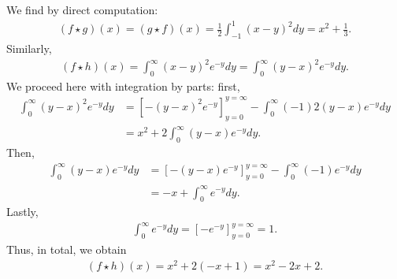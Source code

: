 \documentclass[11pt]{article}
\begin{document}
\begin{solution}
    We find by direct computation:
    \begin{align*}
        (f \star g)(x) = (g \star f)(x) = \frac 1 2 \int_{-1}^1 (x - y)^2 dy = x^2 + \frac 1 3.
    \end{align*}   
    Similarly,
    \begin{align*}
        (f \star h)(x) 
        = 
        \int_{0}^\infty (x - y)^2 e^{-y} dy 
        = 
        \int_{0}^\infty (y - x)^2 e^{-y} dy 
        .
    \end{align*}
    We proceed here with integration by parts: first, 
    \begin{align*}
        \int_{0}^\infty (y - x)^2 e^{-y} dy 
        &=
        \left[ - (y - x)^2 e^{-y} \right]_{y=0}^{y=\infty}
        -
        \int_{0}^\infty (-1)2(y - x) e^{-y} dy 
        \\
        &=
        x^2 
        +
        2
        \int_{0}^\infty (y - x) e^{-y} dy 
        .
    \end{align*}
    Then, 
    \begin{align*}
        \int_{0}^\infty (y - x) e^{-y} dy 
        &=
        \left[ - (y - x) e^{-y} \right]_{y=0}^{y=\infty}
        -
        \int_{0}^\infty (-1) e^{-y} dy 
        \\
        &=
        -x 
        +
        \int_{0}^\infty e^{-y} dy 
        .
    \end{align*}
    Lastly,
    \begin{align*}
        \int_{0}^\infty e^{-y} dy = \left[ - e^{-y} \right]_{y=0}^{y=\infty} = 1
        .
    \end{align*}
    Thus, in total, we obtain 
    \begin{align*}
        (f \star h)(x) 
        =
        x^{2} + 2 \left( -x + 1 \right) = x^{2} - 2 x + 2.
    \end{align*}
\end{solution}
\end{document}
